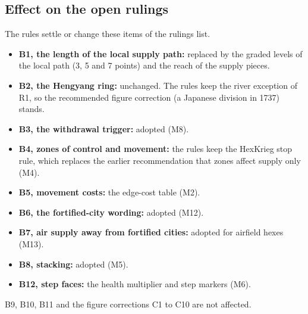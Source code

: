 \documentclass[11pt]{article}
\begin{document}
\subsection{Effect on the open rulings}\label{sub:rulings}
The rules settle or change these items of the rulings list.
\begin{itemize}
\item \textbf{B1, the length of the local supply path:} replaced by the graded levels of the local path (3, 5 and 7 points) and the reach of the supply pieces.
\item \textbf{B2, the Hengyang ring:} unchanged. The rules keep the river exception of R1, so the recommended figure correction (a Japanese division in 1737) stands.
\item \textbf{B3, the withdrawal trigger:} adopted (M8).
\item \textbf{B4, zones of control and movement:} the rules keep the HexKrieg stop rule, which replaces the earlier recommendation that zones affect supply only (M4).
\item \textbf{B5, movement costs:} the edge-cost table (M2).
\item \textbf{B6, the fortified-city wording:} adopted (M12).
\item \textbf{B7, air supply away from fortified cities:} adopted for airfield hexes (M13).
\item \textbf{B8, stacking:} adopted (M5).
\item \textbf{B12, step faces:} the health multiplier and step markers (M6).
\end{itemize}
B9, B10, B11 and the figure corrections C1 to C10 are not affected.
\end{document}
